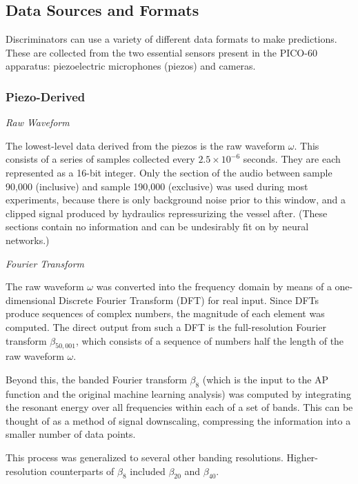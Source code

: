 \documentclass[10pt]{article}
\begin{document}
\subsection{Data Sources and Formats} \label{data_formats}

Discriminators can use a variety of different data formats to make predictions. These are collected from the two essential sensors present in the PICO-60 apparatus: piezoelectric microphones (piezos) and cameras.

\subsubsection{Piezo-Derived}

\textit{Raw Waveform}

The lowest-level data derived from the piezos is the raw waveform $\omega$. This consists of a series of samples collected every $2.5 \times 10^{-6}$ seconds. They are each represented as a 16-bit integer. Only the section of the audio between sample 90,000 (inclusive) and sample 190,000 (exclusive) was used during most experiments, because there is only background noise prior to this window, and a clipped signal produced by hydraulics repressurizing the vessel after. (These sections contain no information and can be undesirably fit on by neural networks.)

\textit{Fourier Transform}

The raw waveform $\omega$ was converted into the frequency domain by means of a one-dimensional Discrete Fourier Transform (DFT) for real input. Since DFTs produce sequences of complex numbers, the magnitude of each element was computed. The direct output from such a DFT is the full-resolution Fourier transform $\beta _{50,001}$, which consists of a sequence of numbers half the length of the raw waveform $\omega$.

Beyond this, the banded Fourier transform $\beta_{8}$ (which is the input to the AP function and the original machine learning analysis) was computed by integrating the resonant energy over all frequencies within each of a set of bands. This can be thought of as a method of signal downscaling, compressing the information into a smaller number of data points.

This process was generalized to several other banding resolutions. Higher-resolution counterparts of $\beta_{8}$ included $\beta_{20}$ and $\beta_{40}$.
\end{document}
